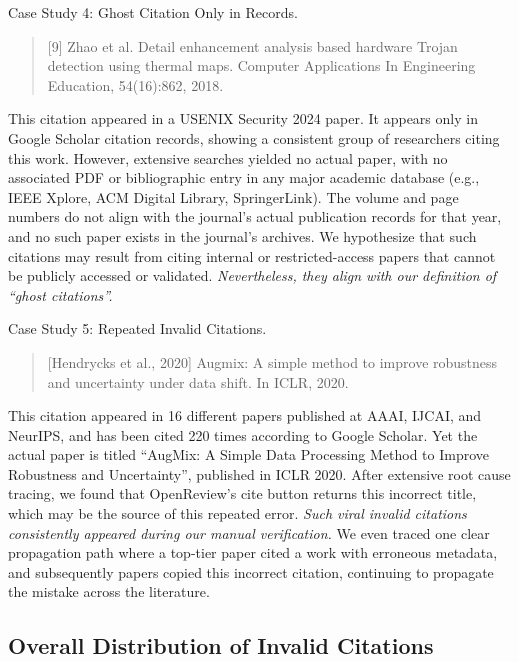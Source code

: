 \begin{casestudybox}{Case Study 4: Ghost Citation Only in Records.}
\begin{quote}
     \small
    [9] Zhao et al. Detail enhancement analysis based hardware Trojan detection using thermal maps. Computer Applications In Engineering Education, 54(16):862, 2018.
\end{quote}
\end{casestudybox}
This citation appeared in a USENIX Security 2024 paper. It appears only in Google Scholar citation records, showing a consistent group of researchers citing this work.
However, extensive searches yielded no actual paper, with no associated PDF or bibliographic entry in any major academic database (e.g., IEEE Xplore, ACM Digital Library, SpringerLink). The volume and page numbers do not align with the journal's actual publication records for that year, and no such paper exists in the journal's archives.
We hypothesize that such citations may result from citing internal or restricted-access papers that cannot be publicly accessed or validated.
\textit{Nevertheless, they align with our definition of ``ghost citations''.}

\begin{casestudybox}{Case Study 5: Repeated Invalid Citations.}
\begin{quote}
     \small
    [Hendrycks et al., 2020] Augmix: A simple method to improve robustness and uncertainty under data shift. In ICLR, 2020.
\end{quote}
\end{casestudybox}
This citation appeared in 16 different papers published at AAAI, IJCAI, and NeurIPS, and has been cited 220 times according to Google Scholar. Yet the actual paper is titled ``AugMix: A Simple Data Processing Method to Improve Robustness and Uncertainty'', published in ICLR 2020. After extensive root cause tracing, we found that OpenReview's cite button returns this incorrect title, which may be the source of this repeated error.
\textit{Such viral invalid citations consistently appeared during our manual verification.} We even traced one clear propagation path where a top-tier paper cited a work with erroneous metadata, and subsequently  papers copied this incorrect citation, continuing to propagate the mistake across the literature.

\subsection{Overall Distribution of Invalid Citations}

